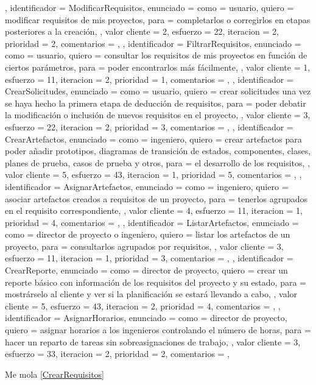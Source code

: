 \documentclass[a4paper, 12pt, spanish]{memoria}
\begin{document}
{{},{%
    identificador = ModificarRequisitos,
    enunciado     = {%
        como = {usuario},
        quiero = {modificar requisitos de mis proyectos},
        para = {completarlos o corregirlos en etapas posteriores a la creación},
    },
    valor cliente = 2,
    esfuerzo      = {2}{2},
    iteracion     = 2,
    prioridad     = 2,
    comentarios   = {},
},{%
    identificador = FiltrarRequisitos,
    enunciado     = {%
        como = {usuario},
        quiero = {consultar los requisitos de mis proyectos en función de ciertos parámetros},
        para = {poder encontrarlos más fácilmente},
    },
    valor cliente = 1,
    esfuerzo      = {1}{1},
    iteracion     = 2,
    prioridad     = 1,
    comentarios   = {},
},{%
    identificador = CrearSolicitudes,
    enunciado     = {%
        como = {usuario},
        quiero = {crear solicitudes una vez se haya hecho la primera etapa de deducción de requisitos},
        para = {poder debatir la modificación o inclusión de nuevos requisitos en el proyecto},
    },
    valor cliente = 3,
    esfuerzo      = {2}{2},
    iteracion     = 2,
    prioridad     = 3,
    comentarios   = {},
},{%
    identificador = CrearArtefactos,
    enunciado     = {%
        como = {ingeniero},
        quiero = {crear artefactos para poder añadir prototipos, diagramas de transición de estados, componentes, clases, planes de prueba, casos de prueba y otros},
        para = {el desarrollo de los requisitos},
    },
    valor cliente = 5,
    esfuerzo      = {4}{3},
    iteracion     = 1,
    prioridad     = 5,
    comentarios   = {},
},{%
    identificador = AsignarArtefactos,
    enunciado     = {%
        como = {ingeniero},
        quiero = {asociar artefactos creados a requisitos de un proyecto},
        para = {tenerlos agrupados en el requisito correspondiente},
    },
    valor cliente = 4,
    esfuerzo      = {1}{1},
    iteracion     = 1,
    prioridad     = 4,
    comentarios   = {},
},{%
    identificador = ListarArtefactos,
    enunciado     = {%
        como = {director de proyecto o ingeniero},
        quiero = {listar los artefactos de un proyecto},
        para = {consultarlos agrupados por requisitos},
    },
    valor cliente = 3,
    esfuerzo      = {1}{1},
    iteracion     = 1,
    prioridad     = 3,
    comentarios   = {},
},{%
    identificador = CrearReporte,
    enunciado     = {%
        como = {director de proyecto},
        quiero = {crear un reporte básico con información de los requisitos del proyecto y su estado},
        para = {mostrárselo al cliente y ver si la planificación se estará llevando a cabo},
    },
    valor cliente = 5,
    esfuerzo      = {4}{3},
    iteracion     = 2,
    prioridad     = 4,
    comentarios   = {},
},{%
    identificador = AsignarHorarios,
    enunciado     = {%
        como = {director de proyecto},
        quiero = {asignar horarios a los ingenieros controlando el número de horas},
        para = {hacer un reparto de tareas sin sobreasignaciones de trabajo},
    },
    valor cliente = 3,
    esfuerzo      = {3}{3},
    iteracion     = 2,
    prioridad     = 2,
    comentarios   = {},
}} %

Me mola \ref{CrearRequisitos}
\end{document}
